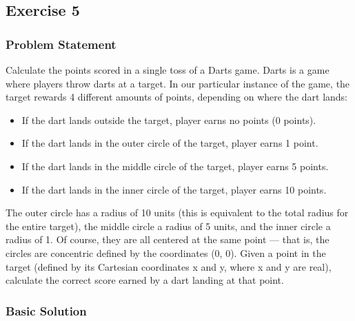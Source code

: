 \documentclass{report}
\begin{document}
    \pagebreak 
    \subsection{Exercise 5}
    \bigbreak \noindent 
    \subsubsection{Problem Statement}
    \bigbreak \noindent 
    Calculate the points scored in a single toss of a Darts game.
    \bigbreak \noindent 
    Darts is a game where players throw darts at a target.
    \bigbreak \noindent 
    In our particular instance of the game, the target rewards 4 different amounts of points, depending on where the dart lands:
    \begin{itemize}
        \item If the dart lands outside the target, player earns no points (0 points).
        \item If the dart lands in the outer circle of the target, player earns 1 point.
        \item If the dart lands in the middle circle of the target, player earns 5 points.
        \item If the dart lands in the inner circle of the target, player earns 10 points.
    \end{itemize}
    \bigbreak \noindent 
    The outer circle has a radius of 10 units (this is equivalent to the total radius for the entire target), the middle circle a radius of 5 units, and the inner circle a radius of 1. Of course, they are all centered at the same point — that is, the circles are concentric defined by the coordinates (0, 0).
    \bigbreak \noindent 
    Given a point in the target (defined by its Cartesian coordinates x and y, where x and y are real), calculate the correct score earned by a dart landing at that point.
    \pagebreak 
    \subsubsection{Basic Solution}
    \bigbreak \noindent 
\end{document}

